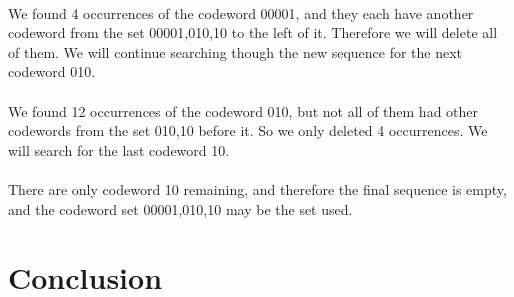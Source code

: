 \documentclass[10pt,letterpaper,notitlepage,draft]{article}
\theoremstyle{definition}
\begin{document}
\\


We found 4 occurrences of the codeword 00001, and they each have another codeword from the set {00001,010,10} to the left of it. 
Therefore we will delete all of them. 
We will continue searching though the new sequence for the next codeword 010.\\

\\

We found 12 occurrences of the codeword 010, but not all of them had other codewords from the set {010,10} before it. 
So we only deleted 4 occurrences.
We will search for the last codeword 10.\\

\\

There are only codeword 10 remaining, and therefore the final sequence is empty, and the codeword set {00001,010,10} may be the set used.

\section{Conclusion}

\nocite{*}

%
% 

\end{document}
